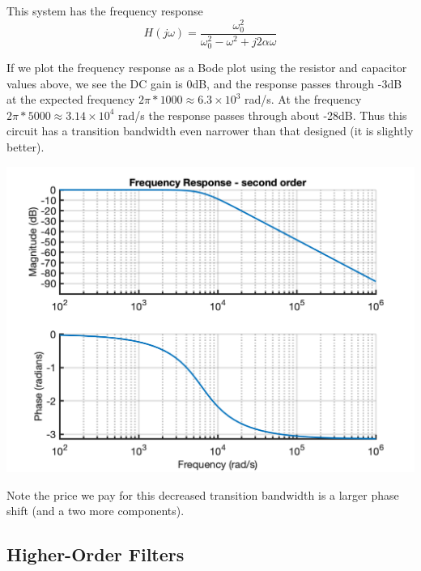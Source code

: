 \begin{example}
\begin{center}
  \end{center}
  
  This system has the frequency response
    \[
  H(j\omega) = \frac{\omega_0^2}{\omega_0^2-\omega^2 + j2\alpha\omega}
  \]

  If we plot the frequency response as a Bode plot using the resistor and capacitor values above, we see the DC gain is 0dB, and the response passes through -3dB at the expected frequency $2\pi*1000 \approx 6.3\times 10^3$ rad/s. At the frequency $2\pi*5000 \approx 3.14\times 10^4$ rad/s the response passes through about -28dB. Thus this circuit has a transition bandwidth even narrower than that designed (it is slightly better). 
  \begin{center}
    \includegraphics[scale=0.7]{graphics/lecture24_2.png}
  \end{center}
  Note the price we pay for this decreased transition bandwidth is a larger phase shift (and a two more components).
\end{example}

\subsection{Higher-Order Filters}

